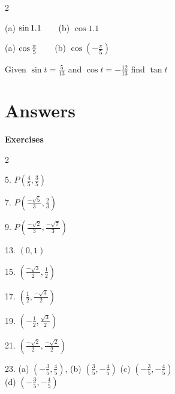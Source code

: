 \begin{description}
	\columnsep =30pt
\begin {multicols}{2}
	\item [9.]   
	(a) $\sin  1.1\text{\quad \quad }$(b) $\cos  1.1$ 
	
	\item [10.] (a) $\cos  \frac{\pi }{5}\text{\quad \quad }$(b) $\cos  \left ( -\frac{\pi }{5}\right )$ 
	\end {multicols}
	
	
	\item [21.]
	Given $\sin  t =\frac{5}{13}$ and $\cos  t = -\frac{12}{13}$ find $\tan  t$ \end{description}

\section{Answers}
\textbf{Exercises} 

\begin {multicols}{2}

5. $P \left (\frac{4}{5} ,\frac{3}{5}\right )$ 

7. $P \left (\frac{ -\sqrt{5}}{3} ,\frac{2}{3}\right )$ 

9. $P \left (\frac{ -\sqrt{2}}{3} ,\frac{ -\sqrt{7}}{3}\right )$ 

13. $\left (0 ,1\right )$ 

15. $\left (\frac{ -\sqrt{3}}{2} ,\frac{1}{2}\right )$ 

17. $\left (\frac{1}{2} ,\frac{ -\sqrt{3}}{2}\right )$ 

19. $\left ( -\frac{1}{2} ,\frac{\sqrt{3}}{2}\right )$ 

21. $\left (\frac{ -\sqrt{2}}{2} ,\frac{ -\sqrt{2}}{2}\right )$ 

23. (a) $\left ( -\frac{3}{5} ,\frac{4}{5}\right )$, (b) $\left (\frac{3}{5} , -\frac{4}{5}\right )$ (c) $\left ( -\frac{3}{5} , -\frac{4}{5}\right )$  \\\relax (d)
$\left ( -\frac{3}{5} , -\frac{4}{5}\right )$ 

\end{multicols}

